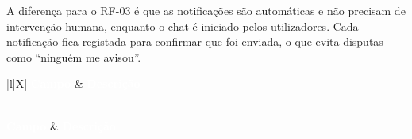 A diferença para o RF-03 é que as notificações são automáticas e não precisam de intervenção humana, enquanto o chat é iniciado pelos utilizadores. Cada notificação fica registada para confirmar que foi enviada, o que evita disputas como ``ninguém me avisou''.

{\small
{}
\begin{xltabular}{\textwidth}{|l|X|}
\hline
{}\textcolor{white}{\textbf{Campo}} & \textcolor{white}{\textbf{Descrição}} \\ \hline
\endfirsthead

 \\
\hline
{}\textcolor{white}{\textbf{Campo}} & \textcolor{white}{\textbf{Descrição}} \\ \hline
\endhead

\hline {} \\ \hline \endfoot

\hline
\caption{Especificação do Requisito Funcional: RF-04}
\label{tab:rf-04} \\
\endlastfoot


\end{xltabular}}
